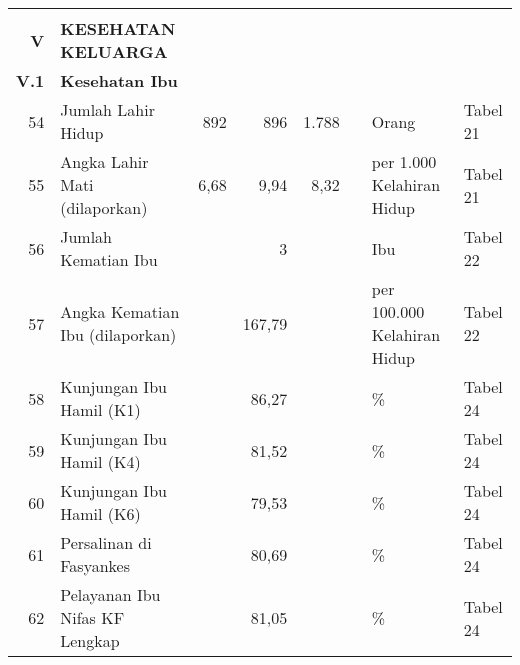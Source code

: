 \begin{small}
\begin{longtable}{rY{12em}rrrrY{5em}Y{5em}}
	    &                                                                             &        &        &                    &          &                                &          \\
	\textbf{V} & \textbf{KESEHATAN KELUARGA}                                          &        &        &                    &          &                                &          \\
	\textbf{V.1} & \textbf{Kesehatan Ibu}                                             &        &        &                    &          &                                &          \\
	 54 & Jumlah Lahir Hidup                                                          &    892 &    896 &              1.788 &          & Orang                          & Tabel 21 \\
	 55 & Angka Lahir Mati (dilaporkan)                                               &   6,68 &   9,94 &               8,32 &          & per 1.000 Kelahiran Hidup      & Tabel 21 \\
	 56 & Jumlah Kematian Ibu                                                         &        &      3 &                    &          & Ibu                            & Tabel 22 \\
	 57 & Angka Kematian Ibu (dilaporkan)                                             &        & 167,79 &                    &          & per 100.000 Kelahiran Hidup    & Tabel 22 \\
	 58 & Kunjungan Ibu Hamil (K1)                                                    &        &  86,27 &                    &          & \%                             & Tabel 24 \\
	 59 & Kunjungan Ibu Hamil (K4)                                                    &        &  81,52 &                    &          & \%                             & Tabel 24 \\
	 60 & Kunjungan Ibu Hamil (K6)                                                    &        &  79,53 &                    &          & \%                             & Tabel 24 \\
	 61 & Persalinan di Fasyankes                                                     &        &  80,69 &                    &          & \%                             & Tabel 24 \\
	 62 & Pelayanan Ibu Nifas KF Lengkap                                              &        &  81,05 &                    &          & \%                             & Tabel 24 \\

\end{longtable}
\end{small}
